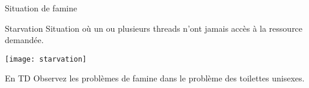
\begingroup

\begin{frame}{Situation de famine}
  \vFill
  \begin{block}{Starvation}
    Situation où un ou  plusieurs threads n'ont \alert{jamais accès}
    à la ressource demandée.
  \end{block}
  \vFill
  \begin{center}
    \texttt{[image: starvation]}
  \end{center}      
  \vFill
  \begin{alertblock}{En TD}
    Observez les problèmes de famine dans le problème des toilettes unisexes.
  \end{alertblock}
  \vFill
\end{frame}

\endgroup
\endinput
